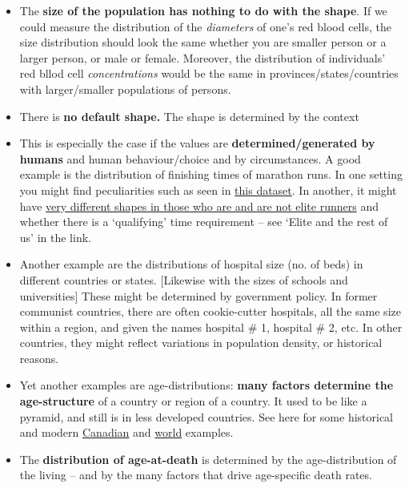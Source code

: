 \documentclass[]{book}
\begin{document}
\begin{itemize}
\item
  The \textbf{size of the population has nothing to do with the shape}. If we could measure the distribution of the \emph{diameters} of one's red blood cells, the size distribution should look the same whether you are smaller person or a larger person, or male or female. Moreover, the distribution of individuals' red bllod cell \emph{concentrations} would be the same in provinces/states/countries with larger/smaller populations of persons.
\item
  There is \textbf{no default shape.} The shape is determined by the context
\item
  This is especially the case if the values are \textbf{determined/generated by humans} and human behaviour/choice and by circumstances. A good example is the distribution of finishing times of marathon runs. In one setting you might find peculiarities such as seen in
  \href{http://www.medicine.mcgill.ca/epidemiology/hanley/statbook/HumanBehaviourDistributionsMarathons.pdf\#page=14}{this dataset}. In another, it might have \href{https://susanli2016.github.io/Boston-Marathon/}{very different shapes in those who are and are not elite runners} and whether there is a `qualifying' time requirement -- see `Elite and the rest of us' in the link.
\item
  Another example are the distributions of hospital size (no. of beds) in different countries or states. {[}Likewise with the sizes of schools and universities{]} These might be determined by government policy. In former communist countries, there are often cookie-cutter hospitals, all the same size within a region, and given the names hospital \# 1, hospital \# 2, etc. In other countries, they might reflect variations in population density, or historical reasons.
\item
  Yet another examples are age-distributions: \textbf{many factors determine the age-structure} of a country or region of a country. It used to be like a pyramid, and still is in less developed countries. See here for some historical and modern
  \href{https://www12.statcan.gc.ca/census-recensement/2016/dp-pd/pyramid/pyramid.cfm?type=1\&geo1=01}{Canadian} and \href{https://www.visualcapitalist.com/animation-population-pyramids-10-biggest-countries/}{world} examples.
\item
  The \textbf{distribution of age-at-death} is determined by the age-distribution of the living -- and by the many factors that drive age-specific death rates.

\end{itemize}
\end{document}
